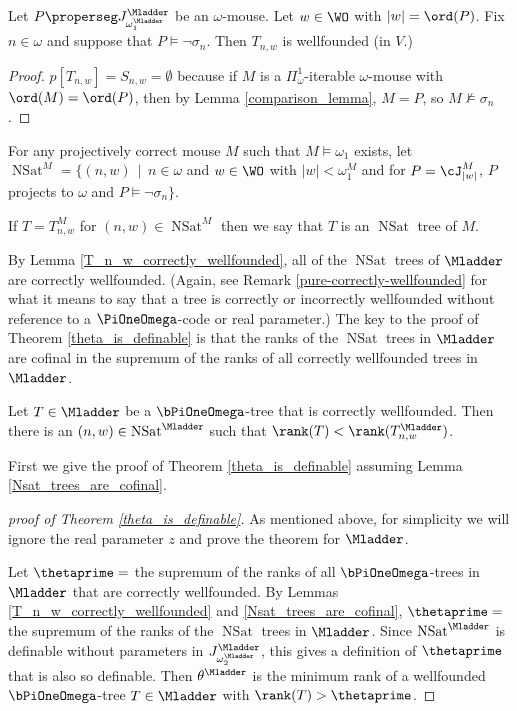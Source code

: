 \documentclass[oneside,12pt]{amsart}
\DeclareMathOperator{\NSat}{NSat}
\begin{document}
\begin{lemma}
\label{T_n_w_correctly_wellfounded}
Let $P\properseg J^{\Mladder}_{\omega_1^{\Mladder}}$ be an $\omega$-mouse. Let $w\in\WO$ with
$|w|=\ord(P)$. Fix $n\in\omega$
and suppose that $P\models \neg \sigma_n$. Then $T_{n,w}$ is wellfounded (in $V$.)
\end{lemma}
\begin{proof}
$p[T_{n,w}]=S_{n,w} = \emptyset$ because if $M$ is a $\Pi^1_{\omega}$-iterable $\omega$-mouse with
$\ord(M) = \ord(P)$, then by Lemma \ref{comparison_lemma}, $M=P$, so $M\not\models\sigma_n$.
\end{proof}

\begin{definition}
For any projectively correct mouse $M$ such that $M\models \omega_1$ exists,
let $\NSat^M=\big\{ (n,w) \, \mid \, n\in\omega$ and $w\in\WO$ with $|w|<\omega_1^{M}$ and
for $P=\cJ^M_{|w|}$, $P$ projects to $\omega$ and $P\models \neg \sigma_n \big\}$.

If $T=T^M_{n,w}$ for $(n,w)\in\NSat^M$ then we say that $T$ is an $\NSat$ tree of $M$.
\end{definition}

By Lemma \ref{T_n_w_correctly_wellfounded}, all of the $\NSat$ trees of $\Mladder$
are correctly wellfounded. (Again, see Remark \ref{pure-correctly-wellfounded} for
what it means to say that a tree is correctly or incorrectly wellfounded
without reference to a $\PiOneOmega$-code or real parameter.)
 The key to the proof of Theorem
 \ref{theta_is_definable} is that the ranks of the $\NSat$ trees in $\Mladder$ are cofinal
 in the supremum of the ranks of all correctly wellfounded trees in $\Mladder$.

\begin{lemma}
\label{Nsat_trees_are_cofinal}
Let $T\in\Mladder$ be a $\bPiOneOmega$-tree that is correctly wellfounded.
Then there is an $(n,w)\in \NSat^{\Mladder}$ such that $\rank(T) < \rank(T^{\Mladder}_{n,w})$.
\end{lemma}

First we give the proof of Theorem \ref{theta_is_definable} assuming Lemma
\ref{Nsat_trees_are_cofinal}.

\begin{proof}[proof of Theorem \ref{theta_is_definable}]
As mentioned above, for simplicity we will ignore the real parameter $z$ and prove
the theorem for $\Mladder$.

Let $\thetaprime = $ the supremum of the ranks of all $\bPiOneOmega$-trees
in $\Mladder$ that are correctly wellfounded. By Lemmas
\ref{T_n_w_correctly_wellfounded} and \ref{Nsat_trees_are_cofinal}, $\thetaprime =$
the supremum of the ranks of the $\NSat$ trees in $\Mladder$.
Since $\NSat^{\Mladder}$
is definable without parameters in $J^{\Mladder}_{\omega_2^{\Mladder}}$,
this gives a definition of $\thetaprime$ that is also
so definable. Then $\theta^{\Mladder}$ is the minimum rank of a wellfounded
$\bPiOneOmega$-tree $T\in\Mladder$ with $\rank(T)>\thetaprime$.
\end{proof}
\end{document}
